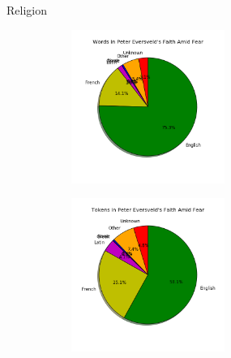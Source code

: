 \documentclass[10pt]{beamer}
\begin{document}
\begin{frame}[fragile]{Religion}
  
  \begin{figure}
  \centering
  \begin{subfigure}
  \centering
    \includegraphics[width=5cm]{religionwords.png}
  \end{subfigure}
  \begin{subfigure}
  \centering
    \includegraphics[width=5cm]{religiontokens.png}
  \end{subfigure}
  \end{figure}  
\end{frame}
\end{document}
